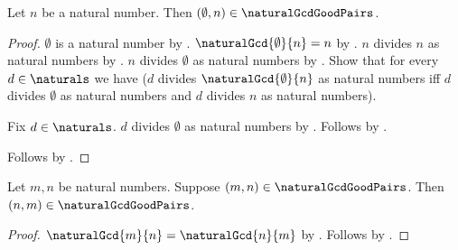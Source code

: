 \begin{corollary}\label{gcd_good_pair_zero_left}
    Let $n$ be a natural number.
    Then $(\emptyset,n)\in\naturalGcdGoodPairs$.
\end{corollary}
\begin{proof}
    $\emptyset$ is a natural number by .
    $\naturalGcd{\emptyset}{n}=n$
        by .
    $n$ divides $n$ as natural numbers
        by .
    $n$ divides $\emptyset$ as natural numbers
        by .
    Show that for every $d\in\naturals$ we have
        ($d$ divides $\naturalGcd{\emptyset}{n}$ as natural numbers iff
         $d$ divides $\emptyset$ as natural numbers and
         $d$ divides $n$ as natural numbers).
    \begin{subproof}
        Fix $d\in\naturals$.
        $d$ divides $\emptyset$ as natural numbers
            by .
        Follows by \auto.
    \end{subproof}
    Follows by .
\end{proof}

\begin{proposition}\label{gcd_good_pair_symmetric}
    Let $m,n$ be natural numbers.
    Suppose $(m,n)\in\naturalGcdGoodPairs$.
    Then $(n,m)\in\naturalGcdGoodPairs$.
\end{proposition}
\begin{proof}
    $\naturalGcd{m}{n}=\naturalGcd{n}{m}$
        by .
    Follows by .
\end{proof}

